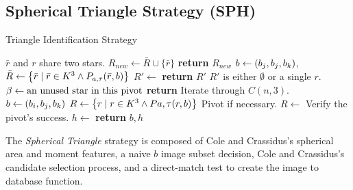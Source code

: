 \subsection{Spherical Triangle Strategy (SPH)}\label{subsec:sphericalTriangleMethod}
\begin{algorithm}
    \caption{Triangle Identification Strategy} \label{algorithm:triangleIdentification}
    \begin{algorithmic}[1]
        \LineComment $\bar{r}$ and $r$ share two stars.
        \State $R_{new} \gets \bar{R} \cup \{\bar{r}\}$
        \EndIf
        \EndFor
        \State \textbf{return} $R_{new}$
        \EndFunction
        \State $b \gets (b_j, b_j, b_k)$, $\bar{R} \gets \left\{  \bar{r} \mid \bar{r} \in K^3
        \land P_{a, \tau}(\bar{r}, b)  \right\}$
        \State $R' \gets $ 
        \State \textbf{return} $R'$ \Comment $R'$ is either $\emptyset$ or a single $r$.
        \Else
        \State $\beta \gets \text{an unused star in this pivot}$
        \State \textbf{return} 
        \EndIf
        \EndFunction
          \Comment Iterate through $C(n, 3)$.
        \State $b \gets \left(b_i, b_j, b_k\right)$
        \State $R \gets \left\{  r \mid r \in K^3
        \land P{a, \tau}(r, b)  \right\}$
         \Comment Pivot if necessary.
        \State $R \gets $ 
        \EndIf
         \Comment Verify the pivot's success.
        \State $h \gets $ 
        \invalidBijection
        \State \textbf{return} $b, h$
        \EndIf
        \EndIf
        \EndFor
        \EndFor
        \EndFor
        \EndFunction
    \end{algorithmic}
\end{algorithm}

The \textit{Spherical Triangle} strategy is composed of Cole and Crassidus's spherical area and moment features, a
naive $b$ image subset decision, Cole and Crassidus's candidate selection process, and a direct-match test to create
the image to database function.

